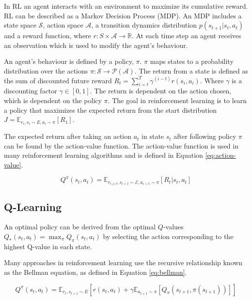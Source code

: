 \documentclass[conference]{IEEEtran}
\begin{document}

In RL an agent interacts with an environment to maximize its cumulative reward. RL can be described as a Markov Decision Process (MDP). An MDP includes a state space $\mathcal{S}$, action space $\mathcal{A}$, a transition dynamics distribution $p(s_{t+1}|s_t,a_t)$ and a reward function, where $r:S\times \mathcal{A} \rightarrow \mathbb{R}$. At each time step an agent receives an observation which is used to modify the agent's behaviour.

An agent's behaviour is defined by a policy, $\pi$. $\pi$ maps states to a probability distribution over the actions $\pi:\mathcal{S}\rightarrow \mathcal{P}(\mathcal{A})$. The return from a state is defined as the sum of discounted future reward $R_t=\sum_{i=t}^T\gamma^{(i-t)}r(s_i,a_i)$. Where $\gamma$ is a discounting factor $\gamma \in [0,1]$. The return is dependent on the action chosen, which is dependent on the policy $\pi$. The goal in reinforcement learning is to learn a policy that maximizes the expected return from the start distribution $J=\mathbb{E}_{r_i,s_i \sim E,a_i \sim \pi}[R_1]$. 

The expected return after taking an action $a_t$ in state $s_t$ after following policy $\pi$ can be found by the action-value function. The action-value function is used in many reinforcement learning algorithms and is defined in Equation \ref{eq:action-value}.

\begin{equation}
	\label{eq:action-value}
	Q^{\pi}(s_t,a_t)=\mathbb{E}_{r_{i\geq t},s_{i>t}\sim \mathcal{E},a_{i>t}\sim\pi}[R_t|s_t,a_t]
\end{equation}


\subsection{Q-Learning}

 An optimal policy can be derived from the optimal $Q$-values $Q_*(s_t,a_t)=\max_\pi Q_\pi(s_t,a_t)$ by selecting the action corresponding to the highest Q-value in each state.

Many approaches in reinforcement learning use the recursive relationship known as the Bellman equation, as defined in Equation \ref{eq:bellman}.

\begin{equation}
	\label{eq:bellman}
	Q^\pi(s_t,a_t)=\mathbb{E}_{{r_t},s_{t+1}\sim E} [r(s_t,a_t)+\gamma\mathbb{E}_{a_{t+1}\sim \pi}[Q_\pi(s_{t+1},\pi(s_{t+1}))]]
\end{equation}
\end{document}
